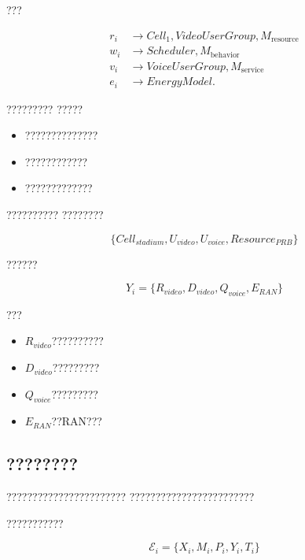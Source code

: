???

\begin{equation}
\begin{aligned}
r_i
&\rightarrow
Cell_1,VideoUserGroup,
M_{\mathrm{resource}}
\\
w_i
&\rightarrow
Scheduler,
M_{\mathrm{behavior}}
\\
v_i
&\rightarrow
VoiceUserGroup,
M_{\mathrm{service}}
\\
e_i
&\rightarrow
EnergyModel.
\end{aligned}
\end{equation}


?????????
?????

\begin{itemize}
    \item ??????????????
    \item ????????????
    \item ?????????????
\end{itemize}


??????????
????????

\begin{equation}
\{
Cell_{stadium},
U_{video},
U_{voice},
Resource_{PRB}
\}
\end{equation}

??????

\begin{equation}
Y_i
=
\{
R_{video},
D_{video},
Q_{voice},
E_{RAN}
\}
\end{equation}

???

\begin{itemize}
    \item $R_{video}$??????????
    \item $D_{video}$?????????
    \item $Q_{voice}$?????????
    \item $E_{RAN}$??RAN???
\end{itemize}



\subsection*{????????}

???????????????????????
????????????????????????

???????????

\begin{equation}
\mathcal{E}_i
=
\{
X_i,
M_i,
P_i,
Y_i,
T_i
\}
\end{equation}

